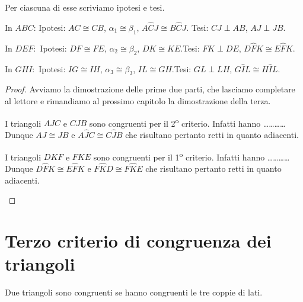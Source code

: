 Per ciascuna di esse scriviamo ipotesi e tesi.
\begin{enumeratea}
\item In $ABC$:	Ipotesi: $AC\cong CB$, $\alpha_1\cong \beta_1$, $A\widehat{C}J\cong B\widehat{C}J$. Tesi: $CJ\perp AB$, $AJ\perp JB$.
\item In $DEF$:	\,Ipotesi: $DF\cong FE$, $\alpha_2\cong \beta_2$, $DK\cong KE$.\tab Tesi: $FK\perp DE$, $D\widehat{F}K\cong E\widehat{F}K$.
\item In $GHI$:	\,Ipotesi: $IG\cong IH$, $\alpha_3\cong \beta_3$, $IL\cong GH$.\tab Tesi: $GL\perp LH$, $G\widehat{I}L\cong H\widehat{I}L$.
\end{enumeratea}

\begin{proof}
Avviamo la dimostrazione delle prime due parti, che lasciamo completare al lettore e rimandiamo al prossimo capitolo la dimostrazione della terza.

\begin{enumeratea}
\item I triangoli $AJC$ e $CJB$ sono congruenti per il 2\textsuperscript{o} criterio. Infatti hanno \ldots\ldots\ldots\ldots{}\\
Dunque $AJ\cong JB$ e $A\widehat{J}C\cong C\widehat{J}B$ che risultano pertanto retti in quanto adiacenti.  
\item I triangoli $DKF$ e $FKE$ sono congruenti per il 1\textsuperscript{o} criterio. Infatti hanno \ldots\ldots\ldots\ldots{}\\
Dunque $D\widehat{F}K\cong E\widehat{F}K$ e $F\widehat{K}D\cong F\widehat{K}E$ che risultano pertanto retti in quanto adiacenti.
\end{enumeratea}
\end{proof}

\section{Terzo criterio di congruenza dei triangoli}\label{sect:terzo_criterio_congruenza_triangoli}

\begin{teorema}
Due triangoli sono congruenti se hanno congruenti le tre coppie di lati.
\end{teorema}

\begin{figure}[htb]
\centering
\end{figure}

